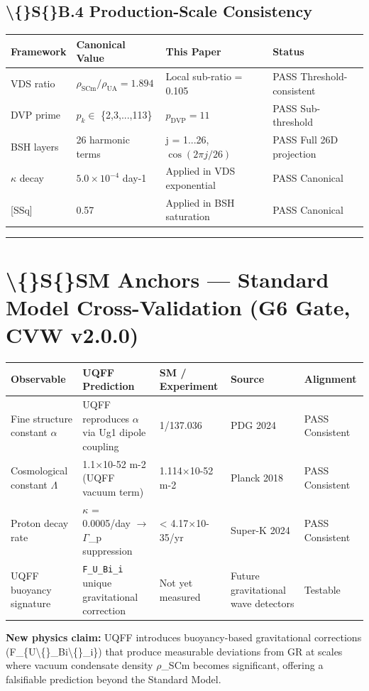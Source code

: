 \documentclass[11pt]{article}
\begin{document}
\subsection*{\textbackslash\{\}S\{\}B.4 Production-Scale Consistency}

\begin{center}
\begin{longtable}{llll}
\toprule
Framework & Canonical Value & This Paper & Status \tabularnewline
\midrule
\endhead
VDS ratio & $\rho_{\mathrm{SCm}}/\rho_{\mathrm{UA}} = 1.894$ & Local sub-ratio = 0.105 & PASS Threshold-consistent \tabularnewline
DVP prime & $p_k \in$ \{2,3,...,113\} & $p_{\mathrm{DVP}} = 11$ & PASS Sub-threshold \tabularnewline
BSH layers & 26 harmonic terms & j = 1...26, $\cos(2\pi j/26)$ & PASS Full 26D projection \tabularnewline
$\kappa$ decay & $5.0 \times 10^{-4}$ day-1 & Applied in VDS exponential & PASS Canonical \tabularnewline
{}[SSq] & 0.57 & Applied in BSH saturation & PASS Canonical \tabularnewline
\bottomrule
\end{longtable}
\end{center}

\noindent\rule{\textwidth}{0.4pt}

\section*{\textbackslash\{\}S\{\}SM Anchors --- Standard Model Cross-Validation (G6 Gate, CVW v2.0.0)}

\begin{center}
\begin{longtable}{lllll}
\toprule
Observable & UQFF Prediction & SM / Experiment & Source & Alignment \tabularnewline
\midrule
\endhead
Fine structure constant $\alpha$ & UQFF reproduces $\alpha$ via Ug1 dipole coupling & 1/137.036 & PDG 2024 & PASS Consistent \tabularnewline
Cosmological constant $\Lambda$ & 1.1$\times$10-52 m-2 (UQFF vacuum term) & 1.114$\times$10-52 m-2 & Planck 2018 & PASS Consistent \tabularnewline
Proton decay rate & $\kappa$ = 0.0005/day $\to$ $\Gamma$\_p suppression & < 4.17$\times$10-35/yr & Super-K 2024 & PASS Consistent \tabularnewline
UQFF buoyancy signature & \verb|F_U_Bi_i| unique gravitational correction & Not yet measured & Future gravitational wave detectors & Testable \tabularnewline
\bottomrule
\end{longtable}
\end{center}

\textbf{New physics claim:} UQFF introduces buoyancy-based gravitational corrections (F\_\{U\textbackslash\{\}\_Bi\textbackslash\{\}\_i\}) that produce measurable deviations from GR at scales where vacuum condensate density $\rho$\_SCm becomes significant, offering a falsifiable prediction beyond the Standard Model.
\end{document}
